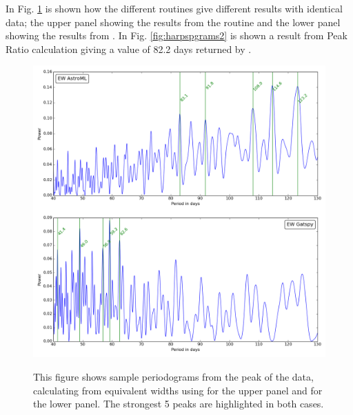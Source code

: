 In Fig. \ref{fig:harpspgrams1} is shown how the different routines give different results with identical data; the upper
panel showing the results from the {\astroml} routine and the lower panel showing the results from {\gatspy}. In
Fig. \ref{fig:harpspgrams2} is shown a result from Peak Ratio calculation giving a value of 82.2 days returned by
\gatspy.

\begin{figure}[!htbp]
\begin{center}
\includegraphics[scale=0.35]{Figures/summpgrams.png} \\
\end{center}   
\caption{This figure shows sample periodograms from the {\ha} peak of the {\harps} data, calculating from equivalent
  widths using {\astroml} for the upper panel and {\gatspy} for the lower panel. The strongest 5 peaks are highlighted
  in both cases.}
\protect\label{fig:harpspgrams1}
\end{figure}

